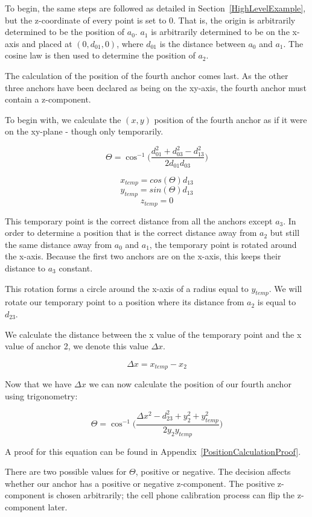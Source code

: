 To begin, the same steps are followed as detailed in Section~\ref{HighLevelExample}, but the z-coordinate of every point is set to 0. That is, the origin is arbitrarily determined to be the position of $a_{0}$. $a_{1}$ is arbitrarily determined to be on the x-axis and placed at $(0, d_{01}, 0)$, where $d_{01}$ is the distance between $a_{0}$ and $a_{1}$. The cosine law is then used to determine the position of $a_{2}$.

The calculation of the position of the fourth anchor comes last. As the other three anchors have been declared as being on the xy-axis, the fourth anchor must contain a z-component.

To begin with, we calculate the $(x, y)$ position of the fourth anchor as if it were on the xy-plane - though only temporarily.

\[ \Theta = \cos ^{ - 1}\Big(\frac{d_{01}^2 + d_{03}^2 - d_{13}^2 }{2 d_{01} d_{03}}\Big)\]

\[ x_{temp} = cos(\Theta) d_{13} \]
\[ y_{temp} = sin(\Theta) d_{13} \]
\[ z_{temp} = 0 \]

This temporary point is the correct distance from all the anchors except $a_3$. In order to determine a position that is the correct distance away from $a_2$ but still the same distance away from $a_0$ and $a_1$, the temporary point is rotated around the x-axis. Because the first two anchors are on the x-axis, this keeps their distance to $a_3$ constant.

This rotation forms a circle around the x-axis of a radius equal to $y_{temp}$. We will rotate our temporary point to a position where its distance from $a_2$ is equal to $d_{23}$.

We calculate the distance between the x value of the temporary point and the x value of anchor 2, we denote this value $\Delta x$.

\[ \Delta x = x_{temp} - x_{2} \]

Now that we have $\Delta x$ we can now calculate the position of our fourth anchor using trigonometry:

\[\Theta = \cos ^{ - 1}\Big(\frac {\Delta x^2 - d_{23}^2 + y_{2}^2 + y_{temp}^2}{2 y_{2} y_{temp}}\Big)\]

A proof for this equation can be found in Appendix~\ref{PositionCalculationProof}.

There are two possible values for $\Theta$, positive or negative. The decision affects whether our anchor has a positive or negative z-component. The positive z-component is chosen arbitrarily; the cell phone calibration process can flip the z-component later.

